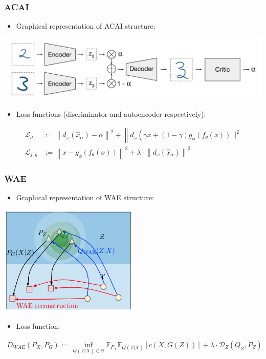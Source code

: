 \documentclass{beamer}
\begin{document}
\begin{frame}
\frametitle{ACAI}
\begin{itemize}
  \item Graphical representation of ACAI structure:
\end{itemize}
\begin{center}
  \includegraphics[width=\textwidth,keepaspectratio]{./figures/acai_structure}
\end{center}
\begin{itemize}
  \item Loss functions (discriminator and autoencoder respectively):
\end{itemize}
\begin{align}
  \mathcal{L}_{d}&:=\left\|d_{\omega}\left(\hat{x}_{\alpha}\right)-\alpha\right\|^{2}+\left\|d_{\omega}\left(\gamma x+(1-\gamma) g_{\phi}\left(f_{\theta}(x)\right) \|^{2}\right.\right. \\
  \mathcal{L}_{f, g}&:=\left\|x-g_{\phi}\left(f_{\theta}(x)\right)\right\|^{2}+\lambda\cdot\left\|d_{\omega}\left(\hat{x}_{\alpha}\right)\right\|^{2}
\end{align}
\end{frame}
\begin{frame}
\frametitle{WAE}
\begin{itemize}
  \item Graphical representation of WAE structure:
\end{itemize}
\begin{center}
  \includegraphics[width=0.50\textwidth,keepaspectratio]{./figures/wae_structure}
\end{center}
\begin{itemize}
  \item Loss function:
\end{itemize}
\begin{align*}
  D_{WAE}(P_X, P_G) := \inf_{Q(Z|X)\in\mathcal{Q}} \mathbb{E}_{P_X}\mathbb{E}_{Q(Z|X)}\left[c(X, G(Z))\right] + \lambda \cdot \mathcal{D}_Z(Q_Z, P_Z)
\end{align*}
\end{frame}
\end{document}
